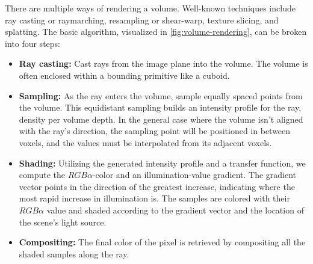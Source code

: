 

There are multiple ways of rendering a volume. Well-known techniques include ray casting or raymarching, resampling or shear-warp, texture slicing, and splatting. The basic algorithm, visualized in \autoref{fig:volume-rendering}, can be broken into four steps:

\begin{itemize}
    \item \textbf{Ray casting:} Cast rays from the image plane into the volume. The volume is often enclosed within a bounding primitive like a cuboid.
    \item \textbf{Sampling:} As the ray enters the volume, sample equally spaced points from the volume. This equidistant sampling builds an intensity profile for the ray, density per volume depth. In the general case where the volume isn't aligned with the ray's direction, the sampling point will be positioned in between voxels, and the values must be interpolated from its adjacent voxels.
    \item \textbf{Shading:} Utilizing the generated intensity profile and a transfer function, we compute the $RGB\alpha$-color and an illumination-value gradient. The gradient vector points in the direction of the greatest increase, indicating where the most rapid increase in illumination is. The samples are colored with their $RGB\alpha$ value and shaded according to the gradient vector and the location of the scene's light source.
    \item \textbf{Compositing:} The final color of the pixel is retrieved by compositing all the shaded samples along the ray. 
\end{itemize}

